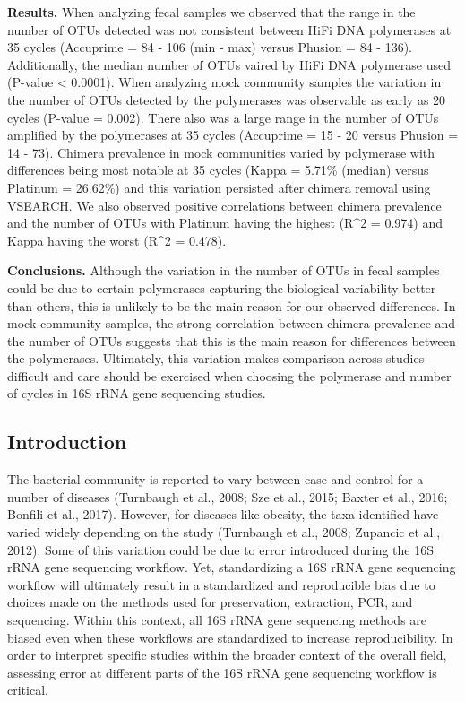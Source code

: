 \documentclass[11pt,]{article}
\begin{document}
\textbf{Results.} When analyzing fecal samples we observed that the
range in the number of OTUs detected was not consistent between HiFi DNA
polymerases at 35 cycles (Accuprime = 84 - 106 (min - max) versus
Phusion = 84 - 136). Additionally, the median number of OTUs vaired by
HiFi DNA polymerase used (P-value \textless{} 0.0001). When analyzing
mock community samples the variation in the number of OTUs detected by
the polymerases was observable as early as 20 cycles (P-value = 0.002).
There also was a large range in the number of OTUs amplified by the
polymerases at 35 cycles (Accuprime = 15 - 20 versus Phusion = 14 - 73).
Chimera prevalence in mock communities varied by polymerase with
differences being most notable at 35 cycles (Kappa = 5.71\% (median)
versus Platinum = 26.62\%) and this variation persisted after chimera
removal using VSEARCH. We also observed positive correlations between
chimera prevalence and the number of OTUs with Platinum having the
highest (R\^{}2 = 0.974) and Kappa having the worst (R\^{}2 = 0.478).

\textbf{Conclusions.} Although the variation in the number of OTUs in
fecal samples could be due to certain polymerases capturing the
biological variability better than others, this is unlikely to be the
main reason for our observed differences. In mock community samples, the
strong correlation between chimera prevalence and the number of OTUs
suggests that this is the main reason for differences between the
polymerases. Ultimately, this variation makes comparison across studies
difficult and care should be exercised when choosing the polymerase and
number of cycles in 16S rRNA gene sequencing studies.

\newpage

\subsection{Introduction}\label{introduction}

The bacterial community is reported to vary between case and control for
a number of diseases (Turnbaugh et al., 2008; Sze et al., 2015; Baxter
et al., 2016; Bonfili et al., 2017). However, for diseases like obesity,
the taxa identified have varied widely depending on the study (Turnbaugh
et al., 2008; Zupancic et al., 2012). Some of this variation could be
due to error introduced during the 16S rRNA gene sequencing workflow.
Yet, standardizing a 16S rRNA gene sequencing workflow will ultimately
result in a standardized and reproducible bias due to choices made on
the methods used for preservation, extraction, PCR, and sequencing.
Within this context, all 16S rRNA gene sequencing methods are biased
even when these workflows are standardized to increase reproducibility.
In order to interpret specific studies within the broader context of the
overall field, assessing error at different parts of the 16S rRNA gene
sequencing workflow is critical.
\end{document}
